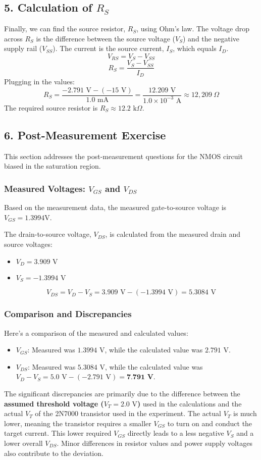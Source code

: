 \documentclass{article}
\begin{document}
\subsection*{5. Calculation of $R_S$}
Finally, we can find the source resistor, $R_S$, using Ohm's law. The voltage drop across $R_S$ is the difference between the source voltage ($V_S$) and the negative supply rail ($V_{SS}$). The current is the source current, $I_S$, which equals $I_D$.
\[ V_{RS} = V_S - V_{SS} \]
\[ R_S = \frac{V_S - V_{SS}}{I_D} \]
Plugging in the values:
\[ R_S = \frac{-2.791 \text{ V} - (-15 \text{ V})}{1.0 \text{ mA}} = \frac{12.209 \text{ V}}{1.0 \times 10^{-3} \text{ A}} \approx 12,209 \ \Omega \]
The required source resistor is \textbf{$R_S \approx 12.2 \text{ k}\Omega$}.

\subsection*{6. Post-Measurement Exercise}
This section addresses the post-measurement questions for the NMOS circuit
biased in the saturation region.

\subsubsection*{Measured Voltages: $V_{GS}$ and $V_{DS}$} Based on the measurement
data, the measured gate-to-source voltage is \textbf{$V_{GS} = 1.3994 \text{
V}$}.

The drain-to-source voltage, $V_{DS}$, is calculated from the measured drain
and source voltages:
\begin{itemize}
  \item $V_D = 3.909 \text{ V}$
  \item $V_S =
    -1.3994 \text{ V}$
\end{itemize} $$ V_{DS} = V_D - V_S = 3.909 \text{ V} - (-1.
3994 \text{ V}) = 5.3084 \text{ V} $$

\subsubsection*{Comparison and Discrepancies} Here's a comparison of the measured
and calculated values:
\begin{itemize}
  \item \textbf{$V_{GS}$}: Measured was
    \textbf{$1.3994 \text{ V}$}, while the calculated value was \textbf{$2.791
    \text{ V}$}.
  \item \textbf{$V_{DS}$}: Measured was \textbf{$5.3084 \text{ V}$},
    while the calculated value was $V_D - V_S = 5.0 \text{ V} - (-2.791 \text{ V}) =
    \textbf{7.791 V}$.
\end{itemize} The significant discrepancies are primarily due
to the difference between the \textbf{assumed threshold voltage ($V_T = 2.0
\text{ V}$)} used in the calculations and the actual $V_T$ of the 2N7000
transistor used in the experiment. The actual $V_T$ is much lower, meaning the
transistor requires a smaller $V_{GS}$ to turn on and conduct the target current.
This lower required $V_{GS}$ directly leads to a less negative $V_S$ and a
lower overall $V_{DS}$. Minor differences in resistor values and power supply
voltages also contribute to the deviation.
\end{document}
